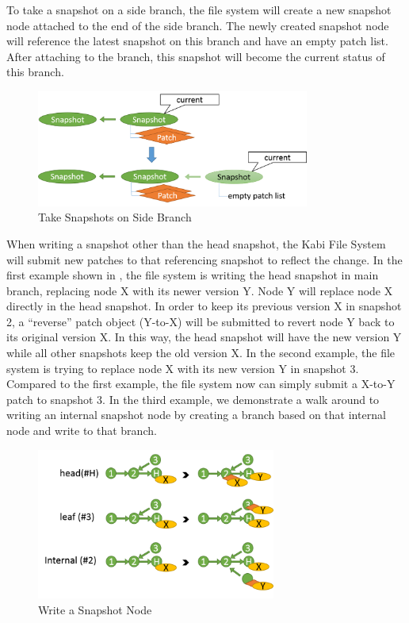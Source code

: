 	To take a snapshot on a side branch, the file system will create a new snapshot node attached to the end of the side branch. The newly created snapshot node will reference the latest snapshot on this branch and have an empty patch list. After attaching to the branch, this snapshot will become the current status of this branch.

\begin{figure}[t]
\centering
\includegraphics[width=0.8\textwidth]{Chapter-4/figs/fig21.png}
\caption{Take Snapshots on Side Branch}
\label{fig:take_snapshot_nonroot}
\end{figure}
    
    When writing a snapshot other than the head snapshot, the Kabi File System will submit new patches to that referencing snapshot to reflect the change. In the first example shown in , the file system is writing the head snapshot in main branch, replacing node X with its newer version Y. Node Y will replace node X directly in the head snapshot. In order to keep its previous version X in snapshot 2, a ``reverse'' patch object (Y-to-X) will be submitted to revert node Y back to its original version X. In this way, the head snapshot will have the new version Y while all other snapshots keep the old version X. In the second example, the file system is trying to replace node X with its new version Y in snapshot 3. Compared to the first example, the file system now can simply submit a X-to-Y patch to snapshot 3. In the third example, we demonstrate a walk around to writing an internal snapshot node by creating a branch based on that internal node and write to that branch.

\begin{figure}[t]
\centering
\includegraphics[width=0.7\textwidth]{Chapter-4/figs/fig17.png}
\caption{Write a Snapshot Node}
\label{fig:write_snapshot_node}
\end{figure}

